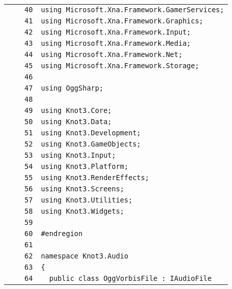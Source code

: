 \documentclass[a4paper,10pt]{article}
\begin{document}
\begin{longtable}[l]{lrrl}
\cellcolor{gray} &  & \verb~40~ & \verb~using Microsoft.Xna.Framework.GamerServices;~\\
\cellcolor{gray} &  & \verb~41~ & \verb~using Microsoft.Xna.Framework.Graphics;~\\
\cellcolor{gray} &  & \verb~42~ & \verb~using Microsoft.Xna.Framework.Input;~\\
\cellcolor{gray} &  & \verb~43~ & \verb~using Microsoft.Xna.Framework.Media;~\\
\cellcolor{gray} &  & \verb~44~ & \verb~using Microsoft.Xna.Framework.Net;~\\
\cellcolor{gray} &  & \verb~45~ & \verb~using Microsoft.Xna.Framework.Storage;~\\
\cellcolor{gray} &  & \verb~46~ & \verb~~\\
\cellcolor{gray} &  & \verb~47~ & \verb~using OggSharp;~\\
\cellcolor{gray} &  & \verb~48~ & \verb~~\\
\cellcolor{gray} &  & \verb~49~ & \verb~using Knot3.Core;~\\
\cellcolor{gray} &  & \verb~50~ & \verb~using Knot3.Data;~\\
\cellcolor{gray} &  & \verb~51~ & \verb~using Knot3.Development;~\\
\cellcolor{gray} &  & \verb~52~ & \verb~using Knot3.GameObjects;~\\
\cellcolor{gray} &  & \verb~53~ & \verb~using Knot3.Input;~\\
\cellcolor{gray} &  & \verb~54~ & \verb~using Knot3.Platform;~\\
\cellcolor{gray} &  & \verb~55~ & \verb~using Knot3.RenderEffects;~\\
\cellcolor{gray} &  & \verb~56~ & \verb~using Knot3.Screens;~\\
\cellcolor{gray} &  & \verb~57~ & \verb~using Knot3.Utilities;~\\
\cellcolor{gray} &  & \verb~58~ & \verb~using Knot3.Widgets;~\\
\cellcolor{gray} &  & \verb~59~ & \verb~~\\
\cellcolor{gray} &  & \verb~60~ & \verb~#endregion~\\
\cellcolor{gray} &  & \verb~61~ & \verb~~\\
\cellcolor{gray} &  & \verb~62~ & \verb~namespace Knot3.Audio~\\
\cellcolor{gray} &  & \verb~63~ & \verb~{~\\
\cellcolor{gray} &  & \verb~64~ & \verb~  public class OggVorbisFile : IAudioFile~\\

\end{longtable}
\end{document}

